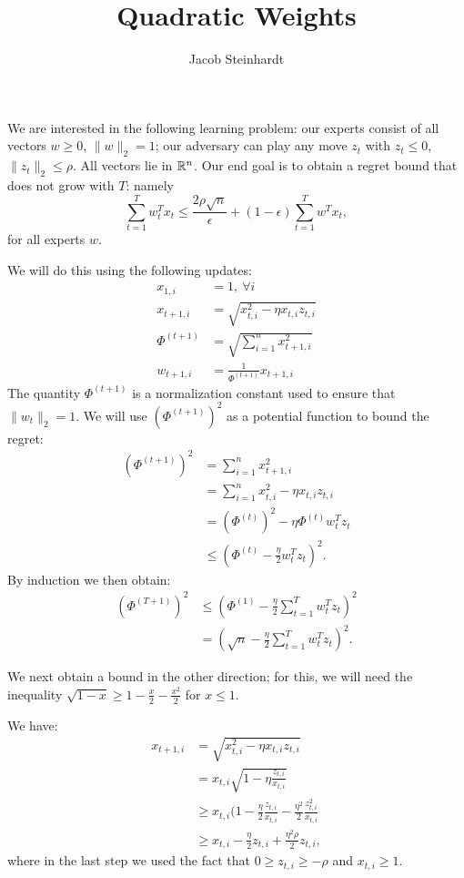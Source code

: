 \documentclass[11pt]{article}
\title{Quadratic Weights}
\author{Jacob Steinhardt}
\begin{document}
\maketitle
We are interested in the following learning problem: our experts 
consist of all vectors $w \geq 0$, $\|w\|_2 = 1$; our adversary 
can play any move $z_t$ with $z_t \leq 0$, $\|z_t\|_2 \leq \rho$. 
All vectors lie in $\mathbb{R}^n$.
Our end goal is to obtain a regret bound that does not grow with $T$:
namely
\[ \sum_{t=1}^T w_t^Tx_t \leq \frac{2\rho \sqrt{n}}{\epsilon} + (1-\epsilon)\sum_{t=1}^T w^Tx_t, \]
for all experts $w$.

We will do this using the following updates:
\begin{align*}
        x_{1, i} &= 1,\ \forall i \\
        x_{t+1, i} &= \sqrt{x_{t,i}^2 - \eta x_{t,i}z_{t,i}} \\
        \Phi^{(t+1)} &= \sqrt{\sum_{i=1}^n x_{t+1,i}^2} \\
        w_{t+1,i} &= \frac{1}{\Phi^{(t+1)}}x_{t+1,i}
\end{align*}
The quantity $\Phi^{(t+1)}$ is a normalization constant used to 
ensure that $\|w_t\|_2 = 1$. We will use $(\Phi^{(t+1)})^2$ as a 
potential function to bound the regret:
\begin{align*}
        (\Phi^{(t+1)})^2 &= \sum_{i=1}^n x_{t+1,i}^2 \\
                         &= \sum_{i=1}^n x_{t,i}^2 - \eta x_{t,i}z_{t,i} \\
                         &= (\Phi^{(t)})^2 - \eta \Phi^{(t)}w_t^Tz_t \\
                         &\leq (\Phi^{(t)}-\frac{\eta}{2}w_t^Tz_t)^2.
\end{align*}
By induction we then obtain:
\begin{align}
        (\Phi^{(T+1)})^2 &\leq (\Phi^{(1)}-\frac{\eta}{2}\sum_{t=1}^Tw_t^Tz_t)^2 \\
                         &= (\sqrt{n}-\frac{\eta}{2}\sum_{t=1}^Tw_t^Tz_t)^2.
\end{align}

We next obtain a bound in the other direction; for this, we will need the 
inequality $\sqrt{1-x} \geq 1-\frac{x}{2}-\frac{x^2}{2}$ for $x \leq 1$.

We have:
\begin{align*}
        x_{t+1,i} &= \sqrt{x_{t,i}^2 - \eta x_{t,i}z_{t,i}} \\
                  &= x_{t,i}\sqrt{1-\eta\frac{z_{t,i}}{x_{t,i}}} \\
                  &\geq x_{t,i}(1-\frac{\eta}{2}\frac{z_{t,i}}{x_{t,i}} - \frac{\eta^2}{2}\frac{z_{t,i}^2}{x_{t,i}} \\
                  &\geq x_{t,i} - \frac{\eta}{2}z_{t,i} + \frac{\eta^2\rho}{2}z_{t,i},
\end{align*}
where in the last step we used the fact 
that $0 \geq z_{t,i} \geq -\rho$ and $x_{t,i} \geq 1$.
\end{document}
